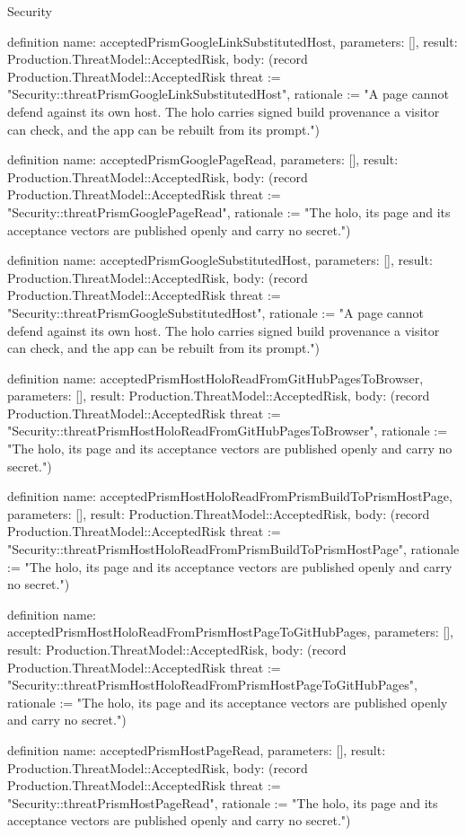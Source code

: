 \begin{lexlean}{Security}
\begin{semanticmodule}
definition{
  name: acceptedPrismGoogleLinkSubstitutedHost,
  parameters: [],
  result: Production.ThreatModel::AcceptedRisk,
  body: (record Production.ThreatModel::AcceptedRisk {threat := "Security::threatPrismGoogleLinkSubstitutedHost", rationale := "A page cannot defend against its own host. The holo carries signed build provenance a visitor can check, and the app can be rebuilt from its prompt."})
}

definition{
  name: acceptedPrismGooglePageRead,
  parameters: [],
  result: Production.ThreatModel::AcceptedRisk,
  body: (record Production.ThreatModel::AcceptedRisk {threat := "Security::threatPrismGooglePageRead", rationale := "The holo, its page and its acceptance vectors are published openly and carry no secret."})
}

definition{
  name: acceptedPrismGoogleSubstitutedHost,
  parameters: [],
  result: Production.ThreatModel::AcceptedRisk,
  body: (record Production.ThreatModel::AcceptedRisk {threat := "Security::threatPrismGoogleSubstitutedHost", rationale := "A page cannot defend against its own host. The holo carries signed build provenance a visitor can check, and the app can be rebuilt from its prompt."})
}

definition{
  name: acceptedPrismHostHoloReadFromGitHubPagesToBrowser,
  parameters: [],
  result: Production.ThreatModel::AcceptedRisk,
  body: (record Production.ThreatModel::AcceptedRisk {threat := "Security::threatPrismHostHoloReadFromGitHubPagesToBrowser", rationale := "The holo, its page and its acceptance vectors are published openly and carry no secret."})
}

definition{
  name: acceptedPrismHostHoloReadFromPrismBuildToPrismHostPage,
  parameters: [],
  result: Production.ThreatModel::AcceptedRisk,
  body: (record Production.ThreatModel::AcceptedRisk {threat := "Security::threatPrismHostHoloReadFromPrismBuildToPrismHostPage", rationale := "The holo, its page and its acceptance vectors are published openly and carry no secret."})
}

definition{
  name: acceptedPrismHostHoloReadFromPrismHostPageToGitHubPages,
  parameters: [],
  result: Production.ThreatModel::AcceptedRisk,
  body: (record Production.ThreatModel::AcceptedRisk {threat := "Security::threatPrismHostHoloReadFromPrismHostPageToGitHubPages", rationale := "The holo, its page and its acceptance vectors are published openly and carry no secret."})
}

definition{
  name: acceptedPrismHostPageRead,
  parameters: [],
  result: Production.ThreatModel::AcceptedRisk,
  body: (record Production.ThreatModel::AcceptedRisk {threat := "Security::threatPrismHostPageRead", rationale := "The holo, its page and its acceptance vectors are published openly and carry no secret."})
}


\end{semanticmodule}
\end{lexlean}
